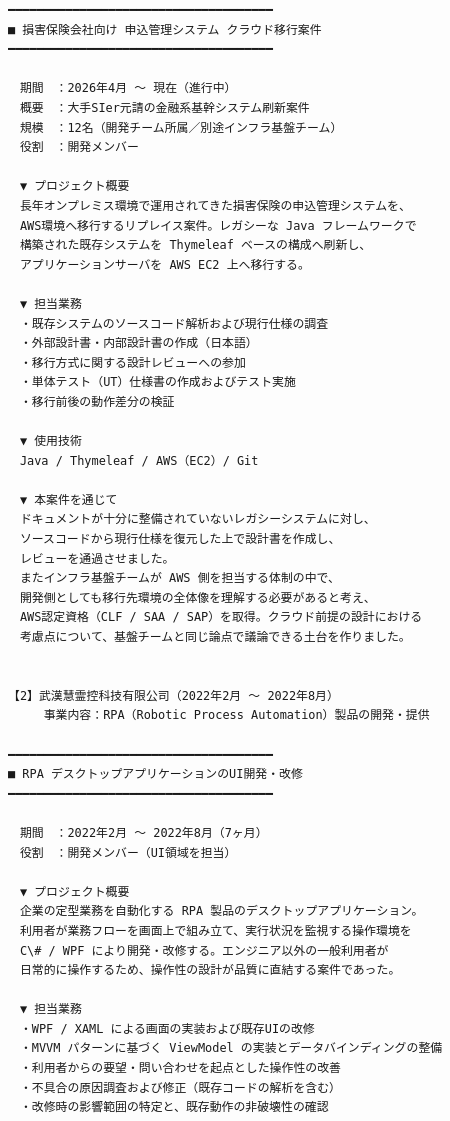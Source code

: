 \documentclass[paper=a4paper,fontsize=9.5pt,head_space=15mm,foot_space=15mm,gutter=18mm,fore_edge=18mm,baselineskip=15.5pt]{jlreq}
\begin{document}
\begin{Verbatim}[fontsize=\small,commandchars=\\\{\}]
━━━━━━━━━━━━━━━━━━━━━━━━━━━━━━━━━━━━━
■ 損害保険会社向け 申込管理システム クラウド移行案件
━━━━━━━━━━━━━━━━━━━━━━━━━━━━━━━━━━━━━

　期間　：2026年4月 〜 現在（進行中）
　概要　：大手SIer元請の金融系基幹システム刷新案件
　規模　：12名（開発チーム所属／別途インフラ基盤チーム）
　役割　：開発メンバー

　▼ プロジェクト概要
　長年オンプレミス環境で運用されてきた損害保険の申込管理システムを、
　AWS環境へ移行するリプレイス案件。レガシーな Java フレームワークで
　構築された既存システムを Thymeleaf ベースの構成へ刷新し、
　アプリケーションサーバを AWS EC2 上へ移行する。

　▼ 担当業務
　・既存システムのソースコード解析および現行仕様の調査
　・外部設計書・内部設計書の作成（日本語）
　・移行方式に関する設計レビューへの参加
　・単体テスト（UT）仕様書の作成およびテスト実施
　・移行前後の動作差分の検証

　▼ 使用技術
　Java / Thymeleaf / AWS（EC2）/ Git

　▼ 本案件を通じて
　ドキュメントが十分に整備されていないレガシーシステムに対し、
　ソースコードから現行仕様を復元した上で設計書を作成し、
　レビューを通過させました。
　またインフラ基盤チームが AWS 側を担当する体制の中で、
　開発側としても移行先環境の全体像を理解する必要があると考え、
　AWS認定資格（CLF / SAA / SAP）を取得。クラウド前提の設計における
　考慮点について、基盤チームと同じ論点で議論できる土台を作りました。


【2】武漢慧霊控科技有限公司（2022年2月 〜 2022年8月）
　　　事業内容：RPA（Robotic Process Automation）製品の開発・提供

━━━━━━━━━━━━━━━━━━━━━━━━━━━━━━━━━━━━━
■ RPA デスクトップアプリケーションのUI開発・改修
━━━━━━━━━━━━━━━━━━━━━━━━━━━━━━━━━━━━━

　期間　：2022年2月 〜 2022年8月（7ヶ月）
　役割　：開発メンバー（UI領域を担当）

　▼ プロジェクト概要
　企業の定型業務を自動化する RPA 製品のデスクトップアプリケーション。
　利用者が業務フローを画面上で組み立て、実行状況を監視する操作環境を
　C\# / WPF により開発・改修する。エンジニア以外の一般利用者が
　日常的に操作するため、操作性の設計が品質に直結する案件であった。

　▼ 担当業務
　・WPF / XAML による画面の実装および既存UIの改修
　・MVVM パターンに基づく ViewModel の実装とデータバインディングの整備
　・利用者からの要望・問い合わせを起点とした操作性の改善
　・不具合の原因調査および修正（既存コードの解析を含む）
　・改修時の影響範囲の特定と、既存動作の非破壊性の確認


\end{Verbatim}
\end{document}
